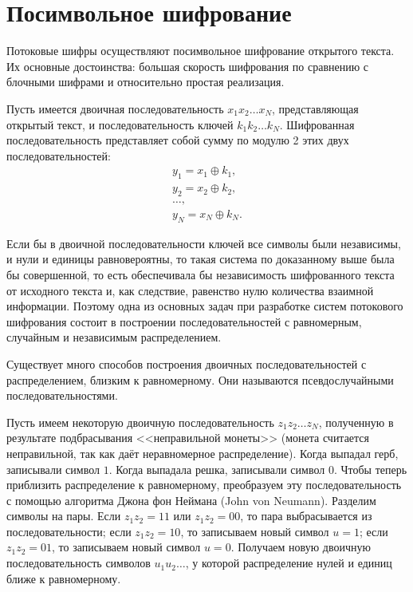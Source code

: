 \section{Посимвольное шифрование}

Потоковые шифры осуществляют посимвольное шифрование открытого текста. Их основные достоинства: большая скорость шифрования по сравнению с блочными шифрами и относительно простая реализация.

Пусть имеется двоичная последовательность $x_{1} x_{2} \dots x_{N}$, представляющая открытый текст, и последовательность ключей $k_{1} k_{2} \dots k_{N}$. Шифрованная последовательность представляет собой сумму по модулю 2 этих двух последовательностей:
\[ \begin{array}{l}
    y_{1} = x_{1} \oplus k_{1}, \\
    y_{2} = x_{2} \oplus k_{2}, \\
    \dots, \\
    y_{N} = x_{N} \oplus k_{N}.
\end{array} \]

Если бы в двоичной последовательности ключей все символы были независимы, и нули и единицы равновероятны, то такая система по доказанному выше была бы совершенной, то есть обеспечивала бы независимость шифрованного текста от исходного текста и, как следствие, равенство нулю количества взаимной информации. Поэтому одна из основных задач при разработке систем потокового шифрования состоит в построении последовательностей с равномерным, случайным и независимым распределением.

Существует много способов построения двоичных последовательностей с распределением, близким к равномерному. Они называются псевдослучайными последовательностями.

Пусть имеем некоторую двоичную последовательность $z_{1} z_{2} \ldots z_{N}$, полученную в результате подбрасывания <<неправильной монеты>> (монета считается неправильной, так как даёт неравномерное распределение). Когда выпадал герб, записывали символ $1$. Когда выпадала решка, записывали символ $0$. Чтобы теперь приблизить распределение к равномерному, преобразуем эту последовательность с помощью алгоритма Джона фон Неймана (John von Neumann). Разделим символы на пары. Если $z_{1} z_{2} = 11$ или $z_{1} z_{2} = 00$, то пара выбрасывается из последовательности; если $z_{1} z_{2} =10$, то записываем новый символ $u=1$; если $z_{1} z_{2} =01$, то записываем новый символ $u=0$. Получаем новую двоичную последовательность символов $u_{1}u_{2}\ldots $, у которой распределение нулей и единиц ближе к равномерному.
